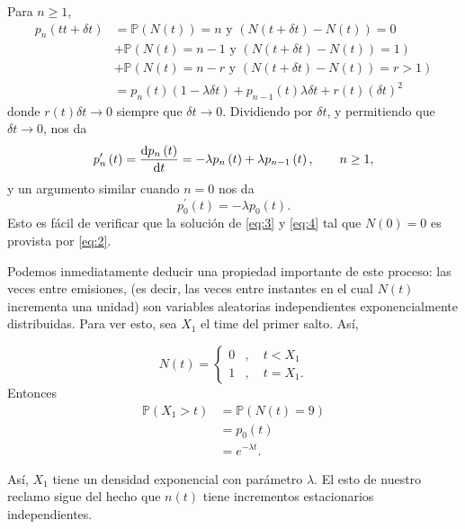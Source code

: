 	Para $n\ge 1$,
	\begin{align*}
		p_{n}\left(tt+\delta t\right)
		&=\mathds{P}\left(N\left(t\right)\right)=n\text{ y } \left(N\left(t+\delta t\right) - N\left(t\right)\right)=0\\
		&+\mathds{P}\left(N\left(t\right)=n-1\text{ y }\left(N\left(t+\delta t\right)-N\left(t\right)\right)=1\right)%
		\\
		&+\mathds{P}\left(N\left(t\right)=n-r\text{ y }\left(N\left(t+\delta t\right)-N\left(t\right)\right)=r>1\right)\\
		&=p_{n}\left(t\right)\left(1-\lambda\delta t\right)+p_{n-1}\left(t\right)\lambda\delta t+r\left(t\right){\left(\delta t\right)}^{2}
	\end{align*}
	donde $r\left(t\right)\delta t\to0$ siempre que $\delta t\to0$. Dividiendo por $\delta t$, y permitiendo que $\delta t\to0$, nos da
	\begin{equation}\label{eq:3}
		p^{\prime}_{n}\left(t\right)=\diff{p_{n}\left(t\right)}{t}=-\lambda p_{n}\left(t\right)+\lambda p_{n-1}\left(t\right),\qquad n\ge1,
	\end{equation}
	y un argumento similar cuando $n=0$ nos da
	\begin{equation}\label{eq:4}
		p^{\prime}_{0}\left(t\right)=-\lambda p_{0}\left(t\right).
	\end{equation}
	Esto es fácil de verificar que la solución de \eqref{eq:3} y \eqref{eq:4} tal que $N\left(0\right)=0$ es provista por \eqref{eq:2}.

	Podemos inmediatamente deducir una propiedad importante de este proceso: las veces entre emisiones, (es decir, las veces entre instantes en el cual $N\left(t\right)$ incrementa una unidad) son variables aleatorias independientes exponencialmente distribuidas. Para ver esto, sea $X_{1}$ el time del primer salto. Así,

	\[
		N\left(t\right)=
		\begin{cases}
			0&,\quad t<X_{1}\\
			1&,\quad t=X_{1}.
		\end{cases}
	\]
	Entonces
	\begin{align*}
		\mathds{P}\left(X_{1}>t\right)
		&=\mathds{P}\left(N\left(t\right)=9\right)\\
		&=p_{0}\left(t\right)\\
		&=e^{-\lambda t}.
	\end{align*}

	Así, $X_{1}$ tiene un densidad exponencial con parámetro $\lambda$. El esto de nuestro reclamo sigue del hecho que $n\left(t\right)$ tiene incrementos estacionarios independientes.


